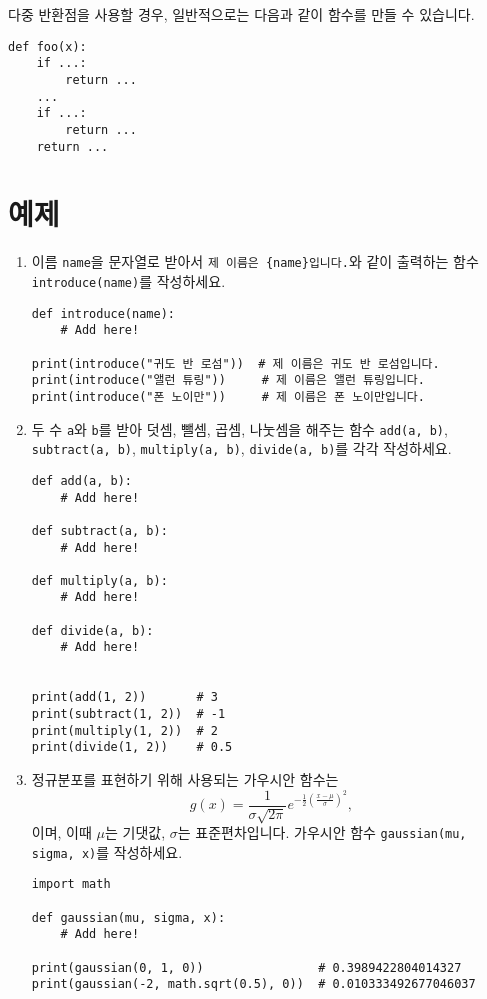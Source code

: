 \documentclass[../main.tex]{subfiles}
\begin{document}
다중 반환점을 사용할 경우, 일반적으로는 다음과 같이 함수를 만들 수 있습니다.
\begin{verbatim}
def foo(x):
    if ...:
        return ...
    ...
    if ...:
        return ...
    return ...
\end{verbatim}

\section{예제}
\begin{enumerate}
  \item 이름 \verb|name|을 문자열로 받아서 \verb|제 이름은 {name}입니다.|와 같이
    출력하는 함수 \verb|introduce(name)|를 작성하세요.
\begin{verbatim}
def introduce(name):
    # Add here!

print(introduce("귀도 반 로섬"))  # 제 이름은 귀도 반 로섬입니다.
print(introduce("앨런 튜링"))     # 제 이름은 앨런 튜링입니다.
print(introduce("폰 노이만"))     # 제 이름은 폰 노이만입니다.
\end{verbatim}

  \item 두 수 \verb|a|와 \verb|b|를 받아 덧셈, 뺄셈, 곱셈, 나눗셈을 해주는 함수
    \verb|add(a, b)|, \verb|subtract(a, b)|, \verb|multiply(a, b)|,
    \verb|divide(a, b)|를 각각 작성하세요.

\begin{verbatim}
def add(a, b):
    # Add here!

def subtract(a, b):
    # Add here!

def multiply(a, b):
    # Add here!

def divide(a, b):
    # Add here!


print(add(1, 2))       # 3
print(subtract(1, 2))  # -1
print(multiply(1, 2))  # 2
print(divide(1, 2))    # 0.5
\end{verbatim}

  \item 정규분포를 표현하기 위해 사용되는 가우시안 함수는
    \[
    g(x) = \frac{1}{\sigma \sqrt{2\pi}} e^{-\frac12 \left(\frac{x - \mu}{\sigma}\right)^2},
    \]
    이며, 이때 $\mu$는 기댓값, $\sigma$는 표준편차입니다.
    가우시안 함수 \verb|gaussian(mu, sigma, x)|를 작성하세요.
\begin{verbatim}
import math

def gaussian(mu, sigma, x):
    # Add here!

print(gaussian(0, 1, 0))                # 0.3989422804014327
print(gaussian(-2, math.sqrt(0.5), 0))  # 0.010333492677046037
\end{verbatim}


\end{enumerate}
\end{document}
